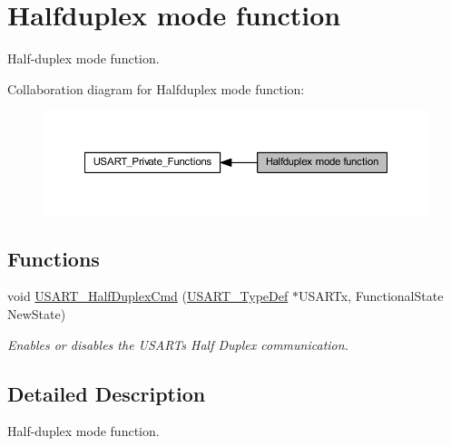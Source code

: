 \hypertarget{group___u_s_a_r_t___group5}{}\section{Halfduplex mode function}
\label{group___u_s_a_r_t___group5}


Half-\/duplex mode function.  


Collaboration diagram for Halfduplex mode function\+:\nopagebreak
\begin{figure}[H]
\begin{center}
\leavevmode
\includegraphics[width=350pt]{group___u_s_a_r_t___group5}
\end{center}
\end{figure}
\subsection*{Functions}
\begin{DoxyCompactItemize}
\item 
void \hyperlink{group___u_s_a_r_t___group5_gaaa23b05fe0e1896bad90da7f82750831}{U\+S\+A\+R\+T\+\_\+\+Half\+Duplex\+Cmd} (\hyperlink{struct_u_s_a_r_t___type_def}{U\+S\+A\+R\+T\+\_\+\+Type\+Def} $\ast$U\+S\+A\+R\+Tx, Functional\+State New\+State)
\begin{DoxyCompactList}\small\item\em Enables or disables the U\+S\+A\+RT\textquotesingle{}s Half Duplex communication. \end{DoxyCompactList}\end{DoxyCompactItemize}


\subsection{Detailed Description}
Half-\/duplex mode function. 

